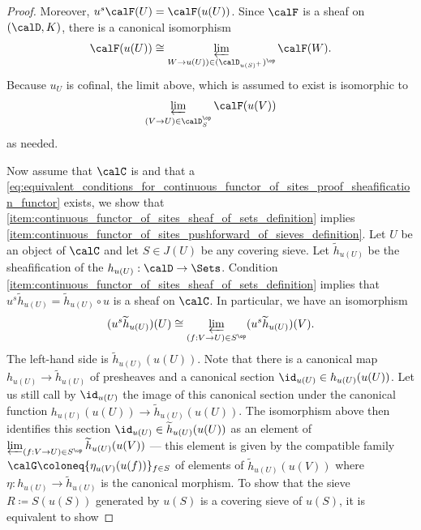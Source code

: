 \begin{proof}
    Moreover, $u^s \calF(U) = \calF(u(U))$. Since $\calF$ is a sheaf on $(\calD, K)$, there is a canonical isomorphism
    $$\calF(u(U)) \cong \varprojlim_{W \to u(U)) \in (\calD_{u(S)^+})^{\op}} \calF(W).$$
    Because $u_U$ is cofinal, the limit above, which is assumed to exist is isomorphic to
    $$\varprojlim_{(V \to U) \in \calD_S^{\op}} \calF(u(V))$$
     as needed.

    Now assume that $\calC$ is  and that a  \eqref{eq:equivalent_conditions_for_continuous_functor_of_sites_proof_sheafification_functor} exists, we show that \eqref{item:continuous_functor_of_sites_sheaf_of_sets_definition} implies \eqref{item:continuous_functor_of_sites_pushforward_of_sieves_definition}. Let $U$ be an object of $\calC$ and let $S \in J(U)$ be any covering sieve. Let $\widetilde{h}_{u(U)}$ be the sheafification of the  $h_{u(U)}: \calD \to \Sets$. Condition \eqref{item:continuous_functor_of_sites_sheaf_of_sets_definition} implies that $u^s \widetilde{h}_{u(U)} = \widetilde{h}_{u(U)} \circ u$ is a sheaf on $\calC$. In particular, we have an isomorphism 
    $$(u^s \widetilde{h}_{u(U)})(U) \cong \varprojlim_{(f: V \to U) \in S^{\op}} (u^s \widetilde{h}_{u(U)})(V).$$
    The left-hand side is $\widetilde{h}_{u(U)} (u(U))$. Note that there is a canonical map $h_{u(U)} \to \widetilde{h}_{u(U)}$ of presheaves and a canonical section $\id_{u(U)} \in h_{u(U)}(u(U))$. Let us still call by $\id_{u(U)}$ the image of this canonical section under the canonical function $h_{u(U)}(u(U)) \to \widetilde{h}_{u(U)}(u(U))$. The isomorphism above then identifies this section $\id_{u(U)} \in \widetilde{h}_{u(U)}(u(U))$ as an element of $\varprojlim_{(f: V \to U) \in S^{\op}} \widetilde{h}_{u(U)}(u(V))$ --- this element is given by the compatible family $\calG \coloneq \{\eta_{u(V)}(u(f))\}_{f \in S}$ of elements of $\widetilde{h}_{u(U)}(u(V))$ where $\eta: h_{u(U)} \to \widetilde{h}_{u(U)}$ is the canonical morphism. To show that the sieve $R \coloneq S(u(S))$ generated by $u(S)$ is a covering sieve of $u(S)$, it is equivalent to show 

\end{proof}
